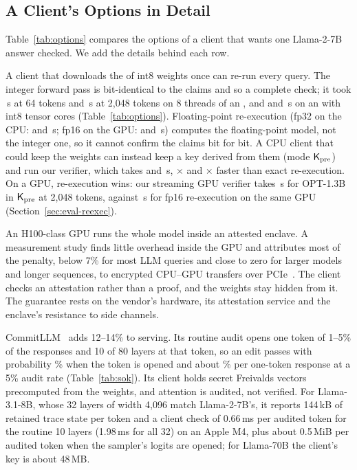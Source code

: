 \subsection{A Client's Options in Detail}
\label{ext:disc-options}

Table~\ref{tab:options} compares the options of a client that wants one Llama-2-7B answer checked.
We add the details behind each row.

 A client that downloads the \WeightsLlama{} of int8 weights once can re-run every
query. The integer forward pass is bit-identical to the claims and so a complete check; it took
\CpuReexecShort{}\,s at 64 tokens and \CpuReexecLong{}\,s at 2{,}048 tokens on 8 threads of an \PlatformCpu{}, and \GpuIntShort{} and
\GpuIntLong{}\,s on an \PlatformGpu{} with int8 tensor cores (Table~\ref{tab:options}). Floating-point
re-execution (fp32 on the CPU: \CpuFloatShort{} and \CpuFloatLong{}\,s; fp16 on the
GPU: \GpuFloatShort{} and \GpuFloatLong{}\,s) computes the floating-point model, not the integer one, so it cannot confirm the claims bit for
bit. A CPU client that could keep the weights can
instead keep a key derived from them (mode $\mathsf{K}_{\mathrm{pre}}$) and run our verifier, which takes \CpuVerifyShort{} and \CpuVerifyLong{}\,s,
\CpuRatioShort{}$\times$ and \CpuRatio{}$\times$ faster than exact re-execution.
On a GPU, re-execution wins: our streaming GPU verifier takes \OptMGpuVerify{}\,s for OPT-1.3B in $\mathsf{K}_{\mathrm{pre}}$ at 2{,}048
tokens, against \OptMGpuFloat{}\,s for fp16 re-execution on the same GPU (Section~\ref{sec:eval-reexec}).

 An H100-class GPU runs the whole model inside an attested
enclave. A measurement study finds little overhead inside the GPU and attributes most of the
penalty, below 7\% for most LLM queries and close to zero for larger models and longer sequences,
to encrypted CPU--GPU transfers over PCIe~\cite{gpucc}. The client checks an attestation rather
than a proof, and the weights stay hidden from it. The guarantee rests on the vendor's hardware,
its attestation service and the enclave's resistance to side channels.

 CommitLLM~\cite{commitllm2026} adds 12--14\% to serving. Its routine
audit opens one token of 1--5\% of the responses and 10 of 80 layers at that token, so an edit
passes with probability \SokCommitOpened{}\% when the token is opened and about \SokCommitRateAbout{}\% per one-token response at
a 5\% audit rate (Table~\ref{tab:sok}). Its client holds secret Freivalds vectors precomputed from
the weights, and attention is audited, not verified. For Llama-3.1-8B, whose 32 layers of width
4{,}096 match Llama-2-7B's, it reports 144\,kB of retained trace state per token and a client check
of 0.66\,ms per audited token for the routine 10 layers (1.98\,ms for all 32) on an Apple M4, plus
about 0.5\,MiB per audited token when the sampler's logits are opened; for Llama-70B the client's
key is about 48\,MB.

